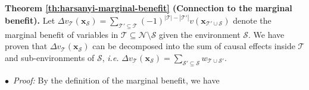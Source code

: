 \noindent\textbf{Theorem \ref{th:harsanyi-marginal-benefit} (Connection to the marginal benefit).} Let {\small $\Delta v_{\mathcal{T}}(\boldsymbol{x}_{\mathcal{S}})=\sum_{\mathcal{T}'\subseteq \mathcal{T}}(-1)^{|\mathcal{T}|-|\mathcal{T}'|}v(\boldsymbol{x}_{\mathcal{T}'\cup \mathcal{S}})$} denote the marginal benefit of variables in {\small $\mathcal{T}\subseteq \mathcal{N}\setminus \mathcal{S}$} given the environment {\small $\mathcal{S}$}. We have proven that {\small $\Delta v_{\mathcal{T}}(\boldsymbol{x}_{\mathcal{S}})$} can be decomposed into the sum of causal effects inside {\small $\mathcal{T}$} and sub-environments of {\small $\mathcal{S}$}, \emph{i.e.} {\small $\Delta v_{\mathcal{T}}(\boldsymbol{x}_{\mathcal{S}})=\sum_{\mathcal{S}'\subseteq \mathcal{S}}w_{\mathcal{T}\cup \mathcal{S}'}$}.


$\bullet$~\textit{Proof:} By the definition of the marginal benefit, we have


